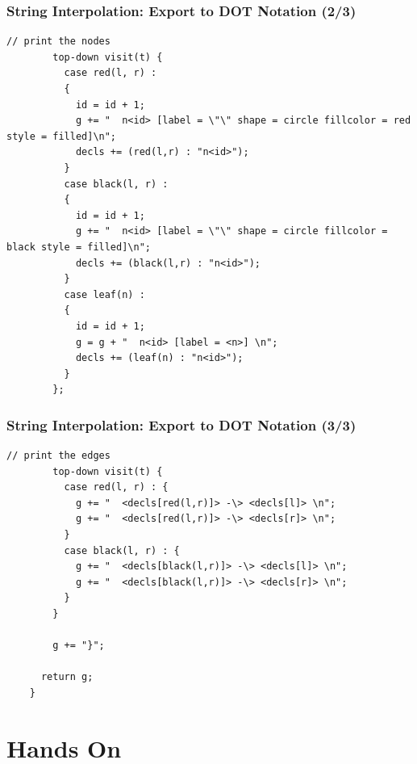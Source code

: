 \documentclass{beamer}
\begin{document}
\begin{frame}[fragile]
  \frametitle{String Interpolation: Export to DOT Notation (2/3)}

  \begin{small}
    \begin{lstlisting}[language=Rascal]
        // print the nodes
        top-down visit(t) {
          case red(l, r) :
          {
            id = id + 1;
            g += "  n<id> [label = \"\" shape = circle fillcolor = red style = filled]\n";
            decls += (red(l,r) : "n<id>");
          }
          case black(l, r) :
          {
            id = id + 1;
            g += "  n<id> [label = \"\" shape = circle fillcolor = black style = filled]\n";
            decls += (black(l,r) : "n<id>");
          }
          case leaf(n) :
          {
            id = id + 1;
            g = g + "  n<id> [label = <n>] \n";
            decls += (leaf(n) : "n<id>");
          }
        };
\end{lstlisting}
  \end{small}
\end{frame}

\begin{frame}[fragile]
  \frametitle{String Interpolation: Export to DOT Notation (3/3)}
  \begin{small}
    \begin{lstlisting}[language=Rascal]
        // print the edges
        top-down visit(t) {
          case red(l, r) : {
            g += "  <decls[red(l,r)]> -\> <decls[l]> \n";
            g += "  <decls[red(l,r)]> -\> <decls[r]> \n";
          }
          case black(l, r) : {
            g += "  <decls[black(l,r)]> -\> <decls[l]> \n";
            g += "  <decls[black(l,r)]> -\> <decls[r]> \n";
          }
        }

        g += "}";

      return g;
    }
  \end{lstlisting}  
  \end{small}  
\end{frame}

\section{Hands On}
\end{document}

